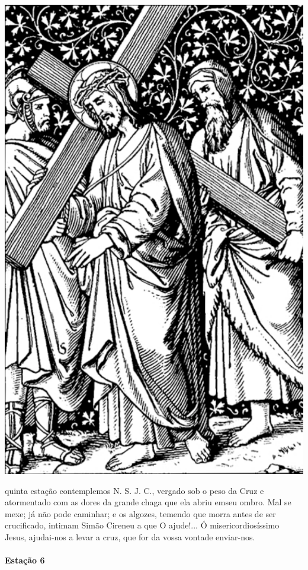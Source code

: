\begin{nscenter}
\includegraphics[width=.8\textwidth, height=.8\textheight, keepaspectratio]{media/station5}
\end{nscenter}

 quinta estação contemplemos N. S. J. C., vergado sob o peso da Cruz e atormentado com as dores da grande chaga que ela abriu emseu ombro. Mal se mexe; já não pode caminhar; e os algozes, temendo que morra antes de ser crucificado, intimam Simão Cireneu a que O ajude!...
Ó misericordiosíssimo Jesus, ajudai-nos a levar a cruz, que for da vossa vontade enviar-nos.

\newpage

\paragraph{Estação 6}

